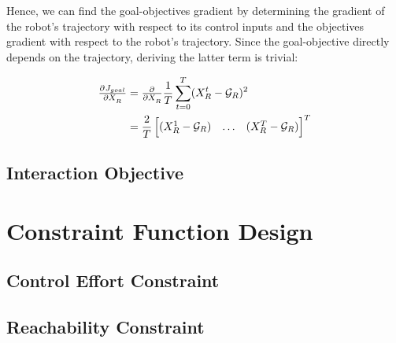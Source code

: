 Hence, we can find the goal-objectives gradient by determining the gradient of the robot's trajectory with respect to its control inputs and the objectives gradient with respect to the robot's trajectory. Since the goal-objective directly depends on the trajectory, deriving the latter term is trivial: 

\begin{align}
\pd{J_{goal}}{X_R} &= \pd{}{X_R} \frac{1}{T} \sum_{t = 0}^T (X_R^t - \mathcal{G}_R)^2 \\
&= \frac{2}{T} \begin{bmatrix} (X_R^1 - \mathcal{G}_R) & \hdots & (X_R^T - \mathcal{G}_R) \end{bmatrix}^T
\end{align}



\subsection{Interaction Objective}
\label{text:approach/objective/interactive}

\section{Constraint Function Design}
\label{text:approach/constraint}

\subsection{Control Effort Constraint}
\label{text:approach/constraint/dynamics}

\subsection{Reachability Constraint}
\label{text:approach/constraint/reachability}


